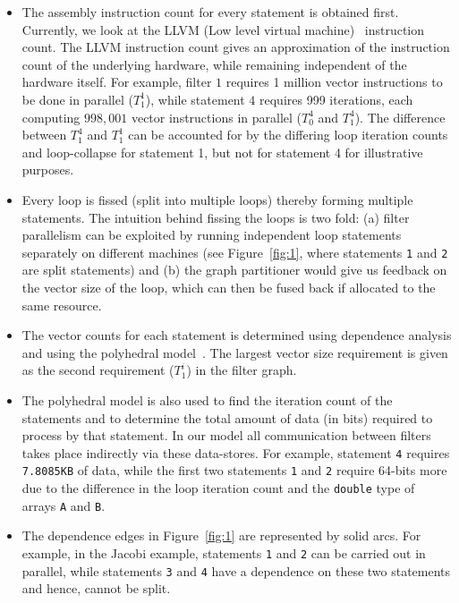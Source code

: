 \begin{itemize}

\item The assembly instruction count for every statement is obtained
  first. Currently, we look at the LLVM (Low level virtual
  machine)~\cite{clat04} instruction count. %
  The LLVM instruction count gives an approximation of the instruction
  count of the underlying hardware, while remaining independent of the
  hardware itself. For example, filter $1$ requires 1 million vector
  instructions to be done in parallel ($T^1_1$), while statement $4$
  requires 999 iterations, each computing $998,001$ vector instructions
  in parallel ($T^4_0$ and $T^4_1$). The difference between $T^4_1$ and
  $T^1_1$ can be accounted for by the differing loop iteration counts
  and loop-collapse for statement 1, but not for statement 4 for
  illustrative purposes.

\item Every loop is fissed (split into multiple loops) thereby forming
  multiple statements. The intuition behind fissing the loops is two
  fold: (a) filter parallelism can be exploited by running independent
  loop statements separately on different machines (see
  Figure~\ref{fig:1}, where statements \texttt{1} and \texttt{2} are
  split statements) and (b) the graph partitioner would give us feedback
  on the vector size of the loop, which can then be fused back if
  allocated to the same resource.

\item The vector counts for each statement is determined using
  dependence analysis and using the polyhedral model~\cite{mgri98}. The
  largest vector size requirement is given as the second requirement
  ($T^i_1$) in the filter graph.

\item The polyhedral model is also used to find the iteration count of
  the statements and to determine the total amount of data (in bits)
  required to process by that statement. In our model all communication
  between filters takes place indirectly via these data-stores. For
  example, statement \texttt{4} requires \texttt{7.8085KB} of data,
  while the first two statements \texttt{1} and \texttt{2} require
  64-bits more due to the difference in the loop iteration count and the
  \texttt{double} type of arrays \texttt{A} and
  \texttt{B}. %

\item The dependence edges in Figure~\ref{fig:1} are represented by solid
arcs. For example, in the Jacobi example, statements \texttt{1} and
  \texttt{2} can be carried out in parallel, while statements
  \texttt{3} and \texttt{4} have a dependence on these two statements
  and hence, cannot be split.

\end{itemize}

